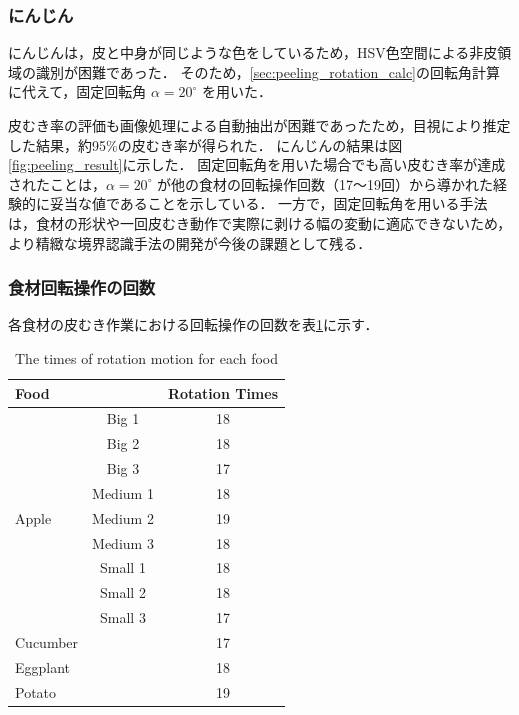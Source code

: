 \subsubsection{にんじん}

にんじんは，皮と中身が同じような色をしているため，HSV色空間による非皮領域の識別が困難であった．
そのため，\ref{sec:peeling_rotation_calc}の回転角計算に代えて，固定回転角 $\alpha = 20^\circ$ を用いた．

皮むき率の評価も画像処理による自動抽出が困難であったため，目視により推定した結果，約95\%の皮むき率が得られた．
にんじんの結果は図\ref{fig:peeling_result}に示した．
固定回転角を用いた場合でも高い皮むき率が達成されたことは，$\alpha = 20^\circ$ が他の食材の回転操作回数（17〜19回）から導かれた経験的に妥当な値であることを示している．
一方で，固定回転角を用いる手法は，食材の形状や一回皮むき動作で実際に剥ける幅の変動に適応できないため，より精緻な境界認識手法の開発が今後の課題として残る．

\subsubsection{食材回転操作の回数}

各食材の皮むき作業における回転操作の回数を表\ref{tab:peeling_rotation_times}に示す．

\begin{table}[ht]
  \centering
  \caption{The times of rotation motion for each food}
  \label{tab:peeling_rotation_times}
  \begin{tabular}{@{}lcc@{}}
    \toprule
    Food &  & Rotation Times \\
    \midrule
    & Big 1 & 18 \\
    & Big 2 & 18 \\
    & Big 3 & 17 \\
    & Medium 1 & 18 \\
Apple & Medium 2 & 19 \\
    & Medium 3 & 18 \\
    & Small 1 & 18 \\
    & Small 2 & 18 \\
    & Small 3 & 17 \\
    \midrule
    Cucumber &  & 17 \\
    Eggplant &  & 18 \\
    Potato &  & 19 \\
    \bottomrule
  \end{tabular}
\end{table}

